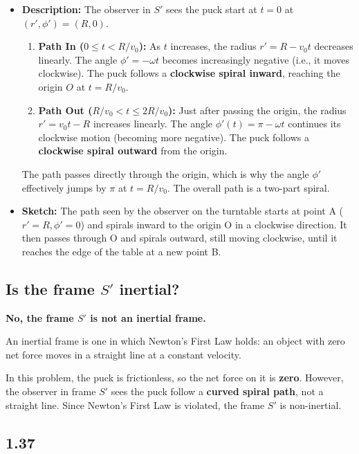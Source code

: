 \documentclass[11pt, a4paper]{article} %
\begin{document}
\begin{itemize}
    \item \textbf{Description:} The observer in $S'$ sees the puck start at $t=0$ at $(r', \phi') = (R, 0)$.
    \begin{enumerate}
        \item \textbf{Path In ($0 \le t < R/v_0$):} As $t$ increases, the radius $r' = R - v_0 t$ decreases linearly. The angle $\phi' = -\omega t$ becomes increasingly negative (i.e., it moves clockwise). The puck follows a \textbf{clockwise spiral inward}, reaching the origin $O$ at $t = R/v_0$.
        \item \textbf{Path Out ($R/v_0 < t \le 2R/v_0$):} Just after passing the origin, the radius $r' = v_0 t - R$ increases linearly. The angle $\phi'(t) = \pi - \omega t$ continues its clockwise motion (becoming more negative). The puck follows a \textbf{clockwise spiral outward} from the origin.
    \end{enumerate}
    The path passes directly through the origin, which is why the angle $\phi'$ effectively jumps by $\pi$ at $t=R/v_0$. The overall path is a two-part spiral.

    \item \textbf{Sketch:}
    The path seen by the observer on the turntable starts at point A ($r'=R, \phi'=0$) and spirals inward to the origin O in a clockwise direction. It then passes through O and spirals outward, still moving clockwise, until it reaches the edge of the table at a new point B.

    
\end{itemize}

\subsection*{Is the frame $S'$ inertial?}

\textbf{No, the frame $S'$ is not an inertial frame.}

An inertial frame is one in which Newton's First Law holds: an object with zero net force moves in a straight line at a constant velocity.

In this problem, the puck is frictionless, so the net force on it is \textbf{zero}. However, the observer in frame $S'$ sees the puck follow a \textbf{curved spiral path}, not a straight line. Since Newton's First Law is violated, the frame $S'$ is non-inertial.

\newpage
\subsection*{1.37}
\end{document}
